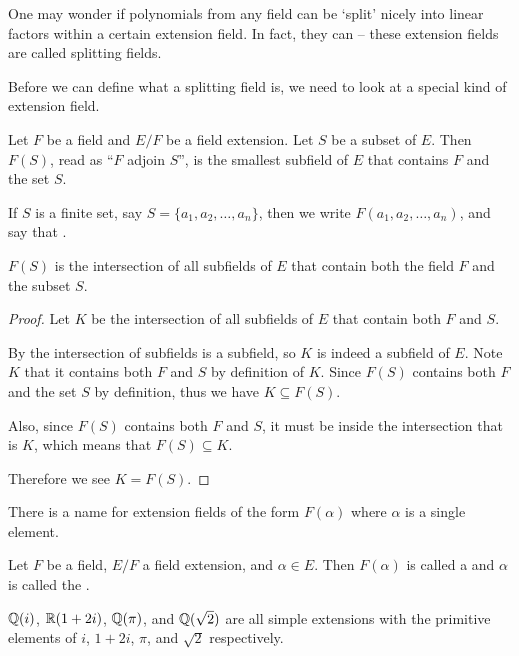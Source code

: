 One may wonder if polynomials from any field can be `split' nicely into linear factors within a certain extension field. In fact, they can -- these extension fields are called splitting fields.

Before we can define what a splitting field is, we need to look at a special kind of extension field.

\begin{definition}
    Let $F$ be a field and $E/F$ be a field extension. Let $S$ be a subset of $E$. Then $F(S)$, read as ``$F$ adjoin $S$'', is the smallest subfield of $E$ that contains $F$ and the set $S$.

    If $S$ is a finite set, say $S = \{a_1, a_2, \dots, a_n\}$, then we write $F(a_1, a_2, \dots, a_n)$, and say that .
\end{definition}

\begin{proposition}
    $F(S)$ is the intersection of all subfields of $E$ that contain both the field $F$ and the subset $S$.
\end{proposition}
\begin{proof}
    Let $K$ be the intersection of all subfields of $E$ that contain both $F$ and $S$.

    By  the intersection of subfields is a subfield, so $K$ is indeed a subfield of $E$. Note $K$ that it contains both $F$ and $S$ by definition of $K$. Since $F(S)$ contains both $F$ and the set $S$ by definition, thus we have $K \subseteq F(S)$.

    Also, since $F(S)$ contains both $F$ and $S$, it must be inside the intersection that is $K$, which means that $F(S) \subseteq K$.

    Therefore we see $K = F(S)$.
\end{proof}

There is a name for extension fields of the form $F(\alpha)$ where $\alpha$ is a single element.

\begin{definition}
    Let $F$ be a field, $E/F$ a field extension, and $\alpha \in E$. Then $F(\alpha)$ is called a  and $\alpha$ is called the .
\end{definition}

\begin{example}
    $\mathbb{Q}(i)$, $\mathbb{R}(1+2i)$, $\mathbb{Q}(\pi)$, and $\mathbb{Q}(\sqrt 2)$ are all simple extensions with the primitive elements of $i$, $1+2i$, $\pi$, and $\sqrt 2$ respectively.
\end{example}


